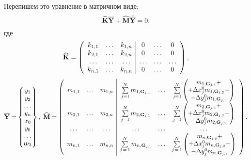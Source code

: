 Перепишем это уравнение в матричном виде:
\begin{equation}
	\widehat{\mathbf{K}} \overline{\mathbf{Y}} + \widehat{\mathbf{M}} \ddot{\overline{\mathbf{Y}}} = 0,
	\label{eq:motionEquationLocal}
\end{equation}
где
\begin{equation*}
\widehat{\mathbf{K}}=
\left(
\begin{array}{c c c | c c c}
k_{1,1} & \hdots & k_{1,n} & 0 & \hdots & 0 \\
k_{2,1} & \hdots & k_{2,n} & 0 & \hdots & 0 \\
\hdots & \hdots & \hdots & \hdots & \hdots & \hdots \\
k_{n,1} & \hdots & k_{n,n} & 0 & \hdots & 0 \\
\end{array}
\right),
\end{equation*}
\begin{equation*}
\overline{\mathbf{Y}} =
\begin{Bmatrix}
	y_1 \\
	y_2 \\
	\hdots \\
	y_n \\
	x_0 \\
	y_0 \\
	\hdots \\
	\upomega_3
\end{Bmatrix}, \
\widehat{\mathbf{M}}=
\left(
\begin{array}{c c c | c c c}
m_{1,1} & \hdots & m_{1,n} &
\sum\limits_{j=1}^N m_{1, \mathbf{G}_{j, 1}} & \hdots
&
\sum\limits_{j=1}^N
\begin{pmatrix}
m_{1,\mathbf{G}_{j,6}} + \\
+ \Delta x_j^0 m_{1, \mathbf{G}_{j,2}} - \\
- \Delta y_j^0 m_{1, \mathbf{G}_{j,1}} \\
\end{pmatrix} \\

m_{2,1} & \hdots & m_{2,n} &
\sum\limits_{j=1}^N m_{2, \mathbf{G}_{j, 1}} & \hdots
&
\sum\limits_{j=1}^N
\begin{pmatrix}
	m_{2,\mathbf{G}_{j,6}} + \\
	+ \Delta x_j^0 m_{2, \mathbf{G}_{j,2}} - \\
	- \Delta y_j^0 m_{2, \mathbf{G}_{j,1}} \\
\end{pmatrix} \\

\hdots & \hdots & \hdots & \hdots & \hdots & \hdots \\

m_{n,1} & \hdots & m_{n,n} 
&
\sum\limits_{j\,=\,1} ^ N m_{n, \mathbf{G}_{j, 1}} 
& 
\hdots
&
\sum\limits_{j\,=\,1} ^ N
\begin{pmatrix}
	m_{n,\mathbf{G}_{j,6}} + \\
	+ \Delta x_j^0 m_{n, \mathbf{G}_{j,2}} - \\
	- \Delta y_j^0 m_{n, \mathbf{G}_{j,1}} \\
\end{pmatrix} \\
\end{array}
\right).
\end{equation*}
